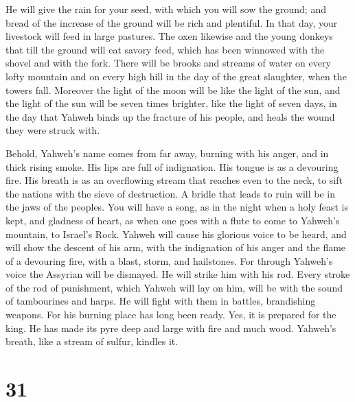  He will give the rain for your seed, with which you will
sow the ground; and bread of the increase of the ground will be rich and
plentiful. In that day, your livestock will feed in large pastures.
 The oxen likewise and the young donkeys that till the
ground will eat savory feed, which has been winnowed with the shovel and
with the fork.  There will be brooks and streams of water
on every lofty mountain and on every high hill in the day of the great
slaughter, when the towers fall.  Moreover the light of
the moon will be like the light of the sun, and the light of the sun
will be seven times brighter, like the light of seven days, in the day
that Yahweh binds up the fracture of his people, and heals the wound
they were struck with.

 Behold, Yahweh's name comes from far away, burning with
his anger, and in thick rising smoke. His lips are full of indignation.
His tongue is as a devouring fire.  His breath is as an
overflowing stream that reaches even to the neck, to sift the nations
with the sieve of destruction. A bridle that leads to ruin will be in
the jaws of the peoples.  You will have a song, as in the
night when a holy feast is kept, and gladness of heart, as when one goes
with a flute to come to Yahweh's mountain, to Israel's Rock.
 Yahweh will cause his glorious voice to be heard, and
will show the descent of his arm, with the indignation of his anger and
the flame of a devouring fire, with a blast, storm, and hailstones.
 For through Yahweh's voice the Assyrian will be
dismayed. He will strike him with his rod.  Every stroke
of the rod of punishment, which Yahweh will lay on him, will be with the
sound of tambourines and harps. He will fight with them in battles,
brandishing weapons.  For his burning place has long been
ready. Yes, it is prepared for the king. He has made its pyre deep and
large with fire and much wood. Yahweh's breath, like a stream of sulfur,
kindles it.

\hypertarget{section-30}{%
\section{31}\label{section-30}}

